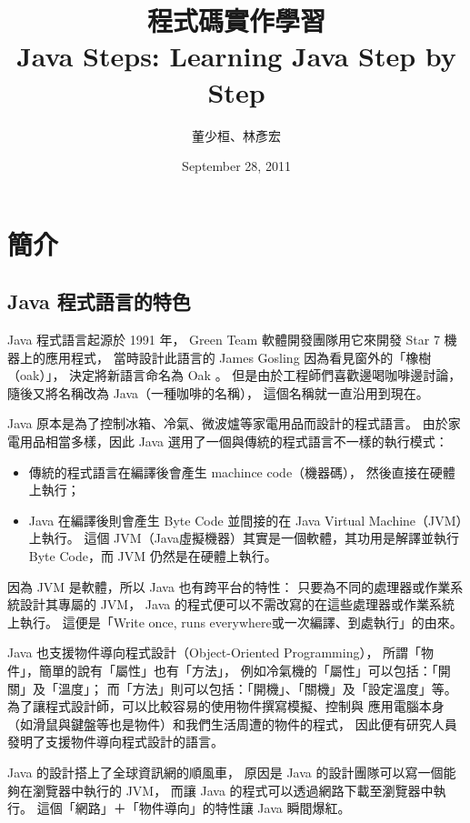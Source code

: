 \documentclass[a4paper,12pt,english]{sphinxmanual}
\title{程式碼實作學習\\Java Steps: Learning Java Step by Step}
\date{September 28, 2011}
\author{董少桓、林彥宏}
\begin{document}
\maketitle
\tableofcontents
{}\label{index::doc}



\chapter{簡介}
\label{java_intro::doc}\label{java_intro:java-steps}\label{java_intro:id1}

\section{Java 程式語言的特色}
\label{java_intro:java}
Java 程式語言起源於 1991 年，
Green Team 軟體開發團隊用它來開發 Star 7 機器上的應用程式，
當時設計此語言的 James Gosling 因為看見窗外的「橡樹（oak）」，
決定將新語言命名為 Oak 。
但是由於工程師們喜歡邊喝咖啡邊討論，
隨後又將名稱改為 Java（一種咖啡的名稱），
這個名稱就一直沿用到現在。

Java 原本是為了控制冰箱、冷氣、微波爐等家電用品而設計的程式語言。
由於家電用品相當多樣，因此 Java 選用了一個與傳統的程式語言不一樣的執行模式：
\begin{itemize}
\item {} 
傳統的程式語言在編譯後會產生 machince code（機器碼），
然後直接在硬體上執行；

\item {} 
Java 在編譯後則會產生 Byte Code 並間接的在 Java Virtual Machine（JVM）上執行。
這個 JVM（Java虛擬機器）其實是一個軟體，其功用是解譯並執行 Byte Code，而 JVM 仍然是在硬體上執行。

\end{itemize}

因為 JVM 是軟體，所以 Java 也有跨平台的特性：
只要為不同的處理器或作業系統設計其專屬的 JVM，
Java 的程式便可以不需改寫的在這些處理器或作業系統上執行。
這便是「Write once, runs everywhere或一次編譯、到處執行」的由來。

Java 也支援物件導向程式設計（Object-Oriented Programming），
所謂「物件」，簡單的說有「屬性」也有「方法」，
例如冷氣機的「屬性」可以包括：「開關」及「溫度」；
而「方法」則可以包括：「開機」、「關機」及「設定溫度」等。
為了讓程式設計師，可以比較容易的使用物件撰寫模擬、控制與
應用電腦本身（如滑鼠與鍵盤等也是物件）和我們生活周遭的物件的程式，
因此便有研究人員發明了支援物件導向程式設計的語言。

Java 的設計搭上了全球資訊網的順風車，
原因是 Java 的設計團隊可以寫一個能夠在瀏覽器中執行的 JVM，
而讓 Java 的程式可以透過網路下載至瀏覽器中執行。
這個「網路」＋「物件導向」的特性讓 Java 瞬間爆紅。
\end{document}
